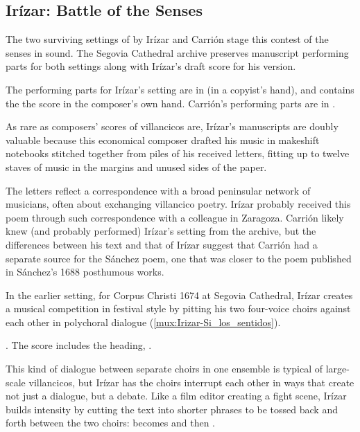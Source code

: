 \subsection{Irízar: Battle of the Senses}

The two surviving settings of  by Irízar and Carrión
stage this contest of the senses in sound.
The Segovia Cathedral archive preserves manuscript performing parts for both
settings along with Irízar's draft score for his version.%
\begin{Footnote}
    The performing parts for Irízar's setting are in  (in a
    copyist's hand), and  contains the the score in the
    composer's own hand.
    Carrión's performing parts are in .
\end{Footnote}
As rare as composers' scores of villancicos are, Irízar's manuscripts are doubly
valuable because this economical composer drafted his music in makeshift
notebooks stitched together from piles of his received letters, fitting up to
twelve staves of music in the margins and unused sides of the paper.%
    \Autocites
    {LopezCalo:IrizarLetters1}
    {Olarte:Irizar}

The letters reflect a correspondence with a broad peninsular network of
musicians, often about exchanging villancico poetry.%
    \Autocite{Rodriguez:Networks}
Irízar probably received this poem through such correspondence with a colleague
in Zaragoza.
Carrión likely knew (and probably performed) Irízar's setting from the archive,
but the differences between his text and that of Irízar suggest that Carrión had
a separate source for the Sánchez poem, one that was closer to the poem
published in Sánchez's 1688 posthumous works.%
    \Autocite[171--172]{Sanchez:LiraPoetica}

In the earlier setting, for Corpus Christi 1674 at Segovia Cathedral, Irízar
creates a musical competition in festival style by pitting his two four-voice
choirs against each other in polychoral dialogue
(\cref{mux:Irizar-Si_los_sentidos}).%
\begin{Footnote}
    \Autocite[133--148]{Cashner:WLSCM32}.  
    The score includes the heading, .
\end{Footnote}
This kind of dialogue between separate choirs in one ensemble is typical of
large-scale villancicos, but Irízar has the choirs interrupt each other in ways
that create not just a dialogue, but a debate.
Like a film editor creating a fight scene, Irízar builds intensity by cutting
the text into shorter phrases to be tossed back and forth between the two
choirs:  becomes  and then
.


